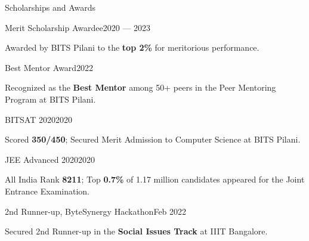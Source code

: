 
\begin{rSection}{Scholarships and Awards}

    \begin{rCompactSubsection}{Merit Scholarship Awardee}{2020 --- 2023}
        \item Awarded by BITS Pilani to the \textbf{top 2\%} for meritorious performance.
    \end{rCompactSubsection}

    \begin{rCompactSubsection}{Best Mentor Award}{2022}
        \item Recognized as the \textbf{Best Mentor} among 50+ peers in the Peer Mentoring Program at BITS Pilani.
    \end{rCompactSubsection}

    \begin{rCompactSubsection}{BITSAT 2020}{2020}
        \item Scored \textbf{350/450}; Secured Merit Admission to Computer Science at BITS Pilani.
    \end{rCompactSubsection}

    \begin{rCompactSubsection}{JEE Advanced 2020}{2020}
        \item All India Rank \textbf{8211}; Top \textbf{0.7\%} of 1.17 million candidates appeared for the Joint Entrance Examination.
    \end{rCompactSubsection}

    \begin{rCompactSubsection}{2nd Runner-up, ByteSynergy Hackathon}{Feb 2022}
        \item Secured 2nd Runner-up in the \textbf{Social Issues Track} at IIIT Bangalore.
    \end{rCompactSubsection}

\end{rSection}